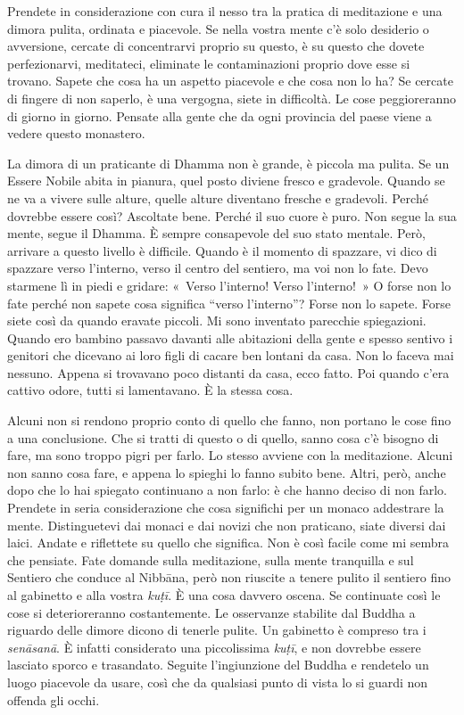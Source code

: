 Prendete in considerazione con cura il nesso tra la pratica di
meditazione e una dimora pulita, ordinata e piacevole. Se nella vostra
mente c'è solo desiderio o avversione, cercate di concentrarvi proprio
su questo, è su questo che dovete perfezionarvi, meditateci, eliminate
le contaminazioni proprio dove esse si trovano. Sapete che cosa ha un
aspetto piacevole e che cosa non lo ha? Se cercate di fingere di non
saperlo, è una vergogna, siete in difficoltà. Le cose peggioreranno di
giorno in giorno. Pensate alla gente che da ogni provincia del paese
viene a vedere questo monastero.

La dimora di un praticante di Dhamma non è grande, è piccola ma pulita.
Se un Essere Nobile abita in pianura, quel posto diviene fresco e
gradevole. Quando se ne va a vivere sulle alture, quelle alture
diventano fresche e gradevoli. Perché dovrebbe essere così? Ascoltate
bene. Perché il suo cuore è puro. Non segue la sua mente, segue il
Dhamma. È sempre consapevole del suo stato mentale. Però, arrivare a
questo livello è difficile. Quando è il momento di spazzare, vi dico di
spazzare verso l'interno, verso il centro del sentiero, ma voi non lo
fate. Devo starmene lì in piedi e gridare: «~Verso l'interno! Verso
l'interno!~» O forse non lo fate perché non sapete cosa significa
``verso l'interno''? Forse non lo sapete. Forse siete così da quando
eravate piccoli. Mi sono inventato parecchie spiegazioni. Quando ero
bambino passavo davanti alle abitazioni della gente e spesso sentivo i
genitori che dicevano ai loro figli di cacare ben lontani da casa. Non
lo faceva mai nessuno. Appena si trovavano poco distanti da casa, ecco
fatto. Poi quando c'era cattivo odore, tutti si lamentavano. È la stessa
cosa.

Alcuni non si rendono proprio conto di quello che fanno, non portano le
cose fino a una conclusione. Che si tratti di questo o di quello, sanno
cosa c'è bisogno di fare, ma sono troppo pigri per farlo. Lo stesso
avviene con la meditazione. Alcuni non sanno cosa fare, e appena lo
spieghi lo fanno subito bene. Altri, però, anche dopo che lo hai
spiegato continuano a non farlo: è che hanno deciso di non farlo.
Prendete in seria considerazione che cosa significhi per un monaco
addestrare la mente. Distinguetevi dai monaci e dai novizi che non
praticano, siate diversi dai laici. Andate e riflettete su quello che
significa. Non è così facile come mi sembra che pensiate. Fate domande
sulla meditazione, sulla mente tranquilla e sul Sentiero che conduce al
Nibbāna, però non riuscite a tenere pulito il sentiero fino al
gabinetto e alla vostra \emph{kuṭī}. È una cosa davvero oscena. Se
continuate così le cose si deterioreranno costantemente. Le osservanze
stabilite dal Buddha a riguardo delle dimore dicono di tenerle pulite.
Un gabinetto è compreso tra i \emph{senāsanā}. È infatti considerato una
piccolissima \emph{kuṭī}, e non dovrebbe essere lasciato sporco e
trasandato. Seguite l'ingiunzione del Buddha e rendetelo un luogo
piacevole da usare, così che da qualsiasi punto di vista lo si guardi
non offenda gli occhi.

